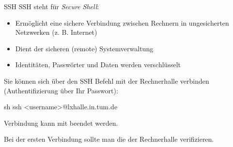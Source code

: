 \documentclass{setbeamer}
\begin{document}
\begin{frame}[fragile]{SSH}
    SSH steht für \emph{Secure Shell}:
    \begin{itemize}
        \item Ermöglicht eine sichere Verbindung zwischen Rechnern in ungesicherten Netzwerken (z. B. Internet)
        \item Dient der sicheren (remote) Systemverwaltung
        \item Identitäten, Passwörter und Daten werden verschlüsselt
    \end{itemize}

    \pause
    \vspace{0.3cm}

    Sie können sich über den SSH Befehl mit der Rechnerhalle verbinden (Authentifizierung über Ihr Passwort):

    \vspace{0.3cm}

    \begin{TUMCodeBlock}{}{sh}
        ssh <username>@lxhalle.in.tum.de
    \end{TUMCodeBlock}
    {\Large \MVRightarrow} Verbindung kann mit  beendet werden.

    \vspace{0.3cm}

    Bei der ersten Verbindung sollte man die  der Rechnerhalle verifizieren.
\end{frame}
\end{document}
